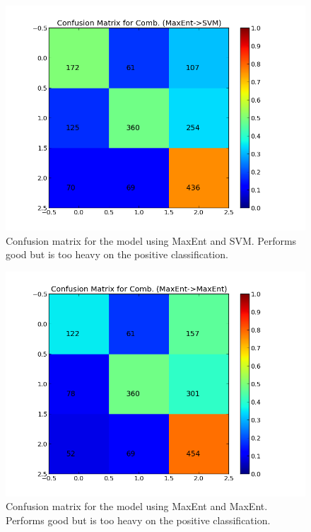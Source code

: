      
\begin{minipage}[!htb]{\linewidth}
     \centering
     \begin{minipage}{0.45\linewidth}
          \begin{figure}[H]
               \includegraphics[width=\linewidth]{../img/plots/grid/confusion_matrix_Comb-MaxEnt-SVM.png}
           \caption[Plot showing the confusion matrix for two-step MaxEnt -> SVM]{Confusion matrix for the model using MaxEnt and SVM. Performs good but is too heavy on the positive classification.}
           \label{fig:confmat_maxent_svm}
          \end{figure}
     \end{minipage}
     \hspace{0.05\linewidth}
     \begin{minipage}{0.45\linewidth}
          \begin{figure}[H]
               \includegraphics[width=\linewidth]{../img/plots/grid/confusion_matrix_Comb-MaxEnt-MaxEnt.png}
           \caption[Plot showing the confusion matrix for two-step MaxEnt -> MaxEnt]{Confusion matrix for the model using MaxEnt and MaxEnt. Performs good but is too heavy on the positive classification.}
           \label{fig:confmat_maxent_maxent}
          \end{figure}
     \end{minipage} \\
     

\end{minipage}

